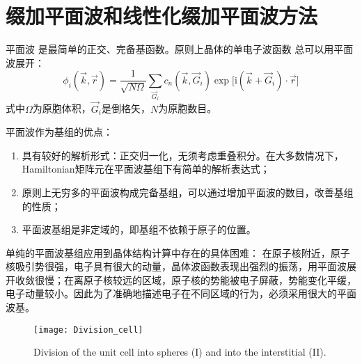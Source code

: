 

\section{缀加平面波和线性化缀加平面波方法}
平面波%
是最简单的正交、完备基函数。原则上晶体的单电子波函数%
总可以用平面波展开：
\begin{equation}
	\phi_i(\vec k,\vec r)=\frac1{\sqrt{N\Omega}}\sum_{\vec G_i}c_n(\vec k,\vec G_i)\exp\big[\mathrm{i}(\vec k+\vec G_i)\cdot\vec r\big]
  \label{eq:solid-84}
\end{equation}
式中$\Omega$为原胞体积，$\vec G_i$是倒格矢，$N$为原胞数目。

平面波作为基组的优点：
\begin{enumerate}
	\item 具有较好的解析形式：正交归一化，无须考虑重叠积分。在大多数情况下， Hamiltonian矩阵元在平面波基组下有简单的解析表达式；
	\item 原则上无穷多的平面波构成完备基组，可以通过增加平面波的数目，改善基组的性质；
	\item 平面波基组是非定域的，即基组不依赖于原子的位置。
\end{enumerate}

单纯的平面波基组应用到晶体结构计算中存在的具体困难：%
在原子核附近，原子核吸引势很强，电子具有很大的动量，晶体波函数表现出强烈的振荡，用平面波展开收敛很慢；在离原子核较远的区域，原子核的势能被电子屏蔽，势能变化平缓，电子动量较小。因此为了准确地描述电子在不同区域的行为，必须采用很大的平面波基。%

\begin{figure}[H]
	\centering
	\texttt{[image: Division\_cell]}
	\caption{Division of the unit cell into spheres (I) and into the interstitial (II).}
	\label{fig:Div_cell}
\end{figure}

